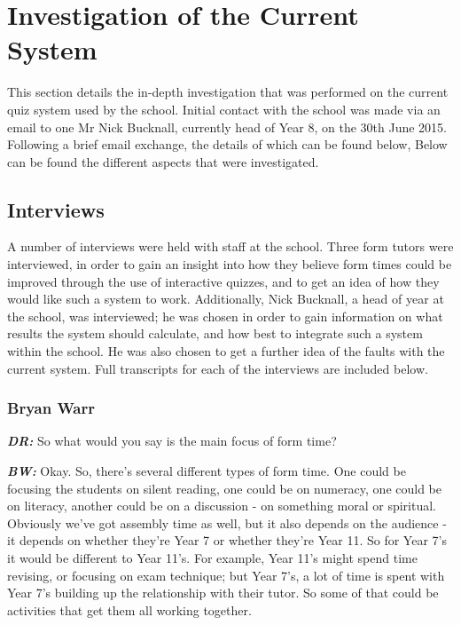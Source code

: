 \section{Investigation of the Current System}
This section details the in-depth investigation that was performed on the current quiz system used by the school. Initial contact with the school was made via an email to one Mr Nick Bucknall, currently head of Year 8, on the 30th June 2015. Following a brief email exchange, the details of which can be found below, Below can be found the different aspects that were investigated.


\subsection{Interviews}
A number of interviews were held with staff at the school. Three form tutors were interviewed, in order to gain an insight into how they believe form times could be improved through the use of interactive quizzes, and to get an idea of how they would like such a system to work. Additionally, Nick Bucknall, a head of year at the school, was interviewed; he was chosen in order to gain information on what results the system should calculate, and how best to integrate such a system within the school. He was also chosen to get a further idea of the faults with the current system. Full transcripts for each of the interviews are included below.

\subsubsection{Bryan Warr}

\textit{\textbf{DR:}} So what would you say is the main focus of form time?

\textit{\textbf{BW:}} Okay. So, there's several different types of form time. One could be focusing the students on silent reading, one could be on numeracy, one could be on literacy, another could be on a discussion - on something moral or spiritual. Obviously we've got assembly time as well, but it also depends on the audience - it depends on whether they're Year 7 or whether they're Year 11. So for Year 7's it would be different to Year 11's. For example, Year 11's might spend time revising, or focusing on exam technique; but Year 7's, a lot of time is spent with Year 7's building up the relationship with their tutor. So some of that could be activities that get them all working together.

